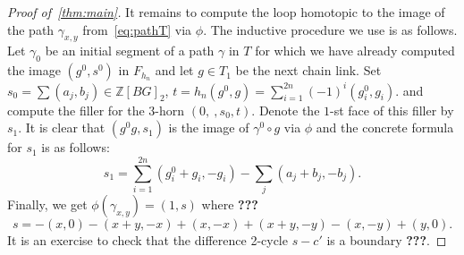 \documentclass[oneside, 12pt]{amsart}
\theoremstyle{plain}
\numberwithin{equation}{section}
\numberwithin{lemma}{section}
\theoremstyle{remark}
\theoremstyle{definition}
\newcommand{\ZZ}{\mathbb{Z}}
\begin{document}
\begin{proof}[Proof of~\cref{thm:main}]
It remains to compute the loop homotopic to the image of the path $\gamma_{x,y}$ from~\eqref{eq:pathT} via $\phi$. %
The inductive procedure we use is as follows. Let $\gamma_0$ be an initial segment of a path $\gamma$ in $T$ for which we have already computed the image
 $(g^0, s^0)$ in $F_{h_n}$ and let $g \in T_1$ be the next chain link. Set $s_0 = \sum (a_j, b_j) \in\ZZ[BG]_2$, $t = h_n (g^0, g) = \sum_{i=1}^{2n}(-1)^i(g^0_i, g_i)$.
and compute the filler for the $3$-horn $(0,\ , s_0, t)$. Denote the $1$-st face of this filler by $s_1$.
It is clear that $(g^0g, s_1)$ is the image of $\gamma^0 \circ g$ via $\phi$ and the concrete formula for $s_1$ is as follows:
\[s_1 = \sum_{i=1}^{2n}(g^0_i + g_i, -g_i) - \sum_j (a_j + b_j, -b_j).\]
Finally, we get $\phi(\gamma_{x, y}) = (1, s)$ where {\bf ???}
\[s= -(x, 0) -(x+y, -x) +(x, -x) +(x+y, -y) -(x, -y) +(y, 0). \]
It is an exercise to check that the difference 2-cycle $s - c'$ is a boundary {\bf ???}.

\end{proof}
\end{document}
